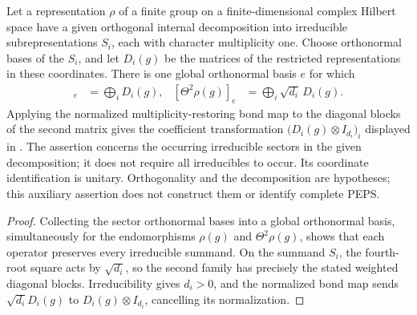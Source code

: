 \begin{lemma}%
    \label{thm:peps_theta_bond_orthonormal_coordinates}
    \leanok
    Let a representation $\rho$ of a finite group on a finite-dimensional
    complex Hilbert space have a
    given orthogonal internal decomposition into irreducible subrepresentations $S_i$,
    each with character multiplicity one. Choose orthonormal bases of the $S_i$, and let $D_i(g)$ be the matrices of
    the restricted representations in these coordinates.
    There is one global orthonormal basis $e$ for which
    \begin{align}
        [\rho(g)]_e         & =\bigoplus_iD_i(g),             &
        [\Theta^2\rho(g)]_e & =\bigoplus_i\sqrt{d_i}\,D_i(g).
    \end{align}
    Applying the normalized multiplicity-restoring bond map to the
    diagonal blocks of the second matrix gives the coefficient transformation
    $\bigl(D_i(g)\otimes I_{d_i}\bigr)_i$ displayed in
    \cite[Section~7]{Schuch2010PEPS}.
    The assertion concerns the occurring irreducible sectors in the given
    decomposition; it does not require all irreducibles to occur.
    Its coordinate identification is unitary. Orthogonality and the
    decomposition are hypotheses; this auxiliary assertion does not
    construct them or identify complete PEPS.
\end{lemma}

\begin{proof}\leanok
    Collecting the sector orthonormal bases into a global orthonormal basis,
    simultaneously for the endomorphisms $\rho(g)$ and $\Theta^2\rho(g)$, shows
    that each operator preserves every irreducible summand. On the summand
    $S_i$, the fourth-root square acts by $\sqrt{d_i}$, so the second family
    has precisely the stated weighted diagonal blocks. Irreducibility gives
    $d_i>0$, and the normalized bond map sends
    $\sqrt{d_i}D_i(g)$ to $D_i(g)\otimes I_{d_i}$, cancelling its normalization.
\end{proof}
